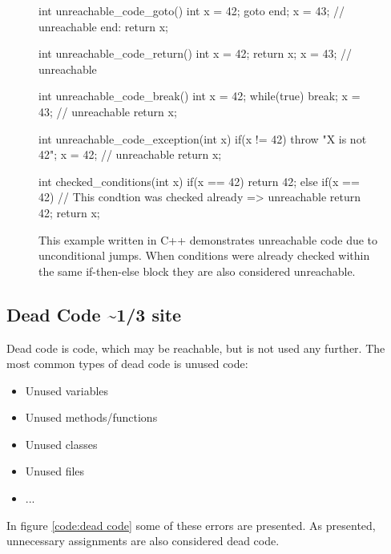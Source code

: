 \begin{figure}
	\begin{CppCode}
int unreachable_code_goto() {
	int x = 42;
	goto end;
	x = 43; // unreachable
	end: return x;
}

int unreachable_code_return() {
	int x = 42;
	return x;
	x = 43; // unreachable
}

int unreachable_code_break() {
	int x = 42;
	while(true) {
		break;
		x = 43; // unreachable
	}
	return x;
}

int unreachable_code_exception(int x) {
	if(x != 42) {
		throw "X is not 42";
		x = 42; // unreachable
	}
	return x;
}

int checked_conditions(int x) {
	if(x == 42) {
		return 42;
	} else if(x == 42) { // This condtion was checked already => unreachable
		return 42;
	}
	return x;
}\end{CppCode}
	\caption{This example written in C++ demonstrates unreachable code due to unconditional jumps. When conditions were already checked within the same if-then-else block they are also considered unreachable.}
	\label{code:unconditional unreachable code}
\end{figure}


\subsection{Dead Code \textasciitilde 1/3 site}
\label{sub:dead code}

Dead code is code, which may be reachable, but is not used any further.
The most common types of dead code is unused code:
\begin{itemize}
	\item Unused variables \cite{Prahofer_2012}
	\item Unused methods/functions \cite{Romano_2016}
	\item Unused classes
	\item Unused files \cite{Boomsma_2012}
	\item ...
\end{itemize}
In figure \ref{code:dead code} some of these errors are presented. As presented, unnecessary assignments are also considered dead code.


